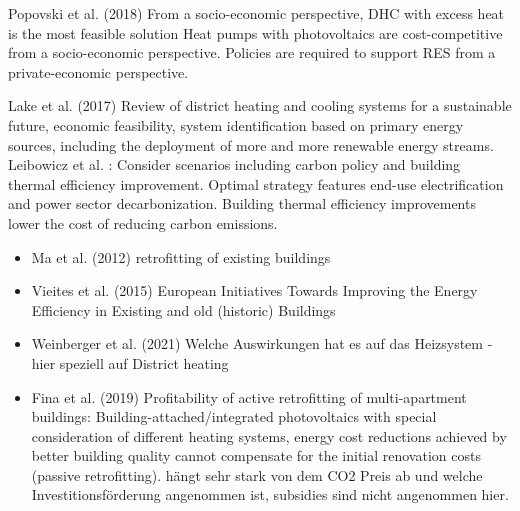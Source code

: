 Popovski et al. (2018) \cite{popovski2018technical} From a socio-economic perspective, DHC with excess heat is the most feasible solution Heat pumps with photovoltaics are cost-competitive from a socio-economic perspective. Policies are required to support RES from a private-economic perspective.
 
Lake et al. (2017) \cite{lake2017review} Review of district heating and cooling systems for a sustainable future, economic feasibility, system identification based on primary energy sources, including the deployment of more and more renewable energy streams. 
Leibowicz et al. \cite{leibowicz2018optimal}: Consider scenarios including carbon policy and building thermal efficiency improvement. Optimal strategy features end-use electrification and power sector decarbonization. Building thermal efficiency improvements lower the cost of reducing carbon emissions.

\begin{itemize}
	\item Ma et al. (2012) \cite{ma2012existing} retrofitting of existing buildings
	\item Vieites et al. (2015) \cite{vieites2015european} European Initiatives Towards Improving the Energy Efficiency in Existing and old (historic) Buildings
	\item Weinberger et al. (2021) \cite{weinberger2021investigating} Welche Auswirkungen hat es auf das Heizsystem - hier speziell auf District heating
	\item Fina et al. (2019) \cite{fina2019profitability} Profitability of active retrofitting of multi-apartment buildings: Building-attached/integrated photovoltaics with special consideration of different heating systems, energy cost reductions achieved by better building quality cannot compensate for the initial renovation costs (passive retrofitting). hängt sehr stark von dem CO2 Preis ab und welche Investitionsförderung angenommen ist, subsidies sind nicht angenommen hier.
\end{itemize}


